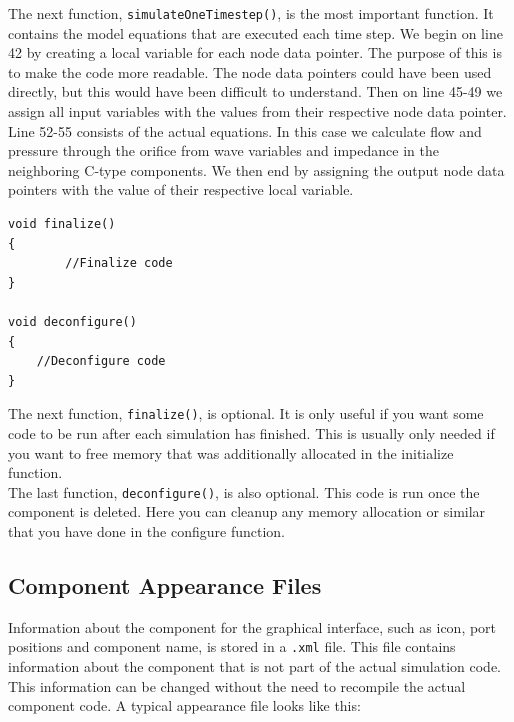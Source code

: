 \documentclass[a4paper,pdftex]{article}
\begin{document}
\noindent The next function, \texttt{simulateOneTimestep()}, is the most important function. 
It contains the model equations that are executed each time step. 
We begin on line 42 by creating a local variable for each node data pointer.
The purpose of this is to make the code more readable.
The node data pointers could have been used directly, but this would have been difficult to understand.
Then on line 45-49 we assign all input variables with the values from their respective node data pointer.
Line 52-55 consists of the actual equations. 
In this case we calculate flow and pressure through the orifice from wave variables and impedance in the neighboring C-type components. 
We then end by assigning the output node data pointers with the value of their respective local variable.

\begin{minipage}{\linewidth}
\begin{lstlisting}[firstnumber=63, basicstyle=\footnotesize\ttfamily]
void finalize()
{
      	//Finalize code
}

void deconfigure()
{
    //Deconfigure code
}
\end{lstlisting}
\end{minipage}

\noindent The next function, \texttt{finalize()}, is optional. 
It is only useful if you want some code to be run after each simulation has finished. 
This is usually only needed if you want to free memory that was additionally allocated in the initialize function.\\
\newline
The last function, \texttt{deconfigure()}, is also optional. 
This code is run once the component is deleted. 
Here you can cleanup any memory allocation or similar that you have done in the configure function. 

\subsection*{Component Appearance Files}
Information about the component for the graphical interface, such as icon, port positions and component name, is stored in a \texttt{.xml} file. This file contains information about the component that is not part of the actual simulation code. This information can be changed without the need to recompile the actual component code. A typical appearance file looks like this:
\end{document}
